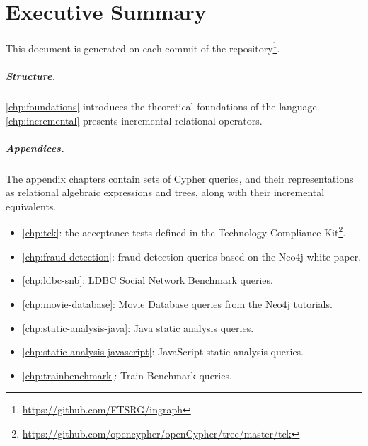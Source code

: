 \chapter*{Executive Summary}
\label{chp:executive-summary}

This document is generated on each commit of the \ingraph repository\footnote{\url{https://github.com/FTSRG/ingraph}}. 

\paragraph{Structure.} \autoref{chp:foundations} introduces the theoretical foundations of the \opencypher language. \autoref{chp:incremental} presents incremental relational operators.

\paragraph{Appendices.} The appendix chapters contain sets of Cypher queries, and their representations as relational algebraic expressions and trees, along with their incremental equivalents.

\begin{itemize}
	\item \autoref{chp:tck}: the acceptance tests defined in the \opencypher Technology Compliance Kit\footnote{\url{https://github.com/opencypher/openCypher/tree/master/tck}}.
	\item \autoref{chp:fraud-detection}: fraud detection queries based on the Neo4j white paper.
	\item \autoref{chp:ldbc-snb}: LDBC Social Network Benchmark queries.
	\item \autoref{chp:movie-database}: Movie Database queries from the Neo4j tutorials.
	\item \autoref{chp:static-analysis-java}: Java static analysis queries.
	\item \autoref{chp:static-analysis-javascript}: JavaScript static analysis queries.
	\item \autoref{chp:trainbenchmark}: Train Benchmark queries.
\end{itemize}
